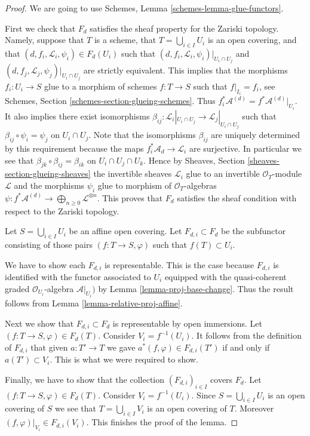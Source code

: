 \begin{proof}
We are going to use Schemes, Lemma \ref{schemes-lemma-glue-functors}.

\medskip\noindent
First we check that $F_d$ satisfies the sheaf property for the
Zariski topology. Namely, suppose that $T$ is a scheme,
that $T = \bigcup_{i \in I} U_i$ is an open covering,
and that $(d, f_i, \mathcal{L}_i, \psi_i) \in F_d(U_i)$ such that
$(d, f_i, \mathcal{L}_i, \psi_i)|_{U_i \cap U_j}$ and
$(d, f_j, \mathcal{L}_j, \psi_j)|_{U_i \cap U_j}$ are strictly
equivalent. This implies that the morphisms $f_i : U_i \to S$
glue to a morphism of schemes $f : T \to S$ such that
$f|_{I_i} = f_i$, see Schemes, Section \ref{schemes-section-glueing-schemes}.
Thus $f_i^*\mathcal{A}^{(d)} = f^*\mathcal{A}^{(d)}|_{U_i}$.
It also implies there exist isomorphisms
$\beta_{ij} : \mathcal{L}_i|_{U_i \cap U_j} \to \mathcal{L}_j|_{U_i \cap U_j}$
such that $\beta_{ij} \circ \psi_i = \psi_j$ on $U_i \cap U_j$.
Note that the isomorphisms $\beta_{ij}$ are uniquely determined
by this requirement because the maps $f_i^*\mathcal{A}_d \to \mathcal{L}_i$
are surjective. In particular we see that
$\beta_{jk} \circ \beta_{ij} = \beta_{ik}$ on $U_i \cap U_j \cap U_k$.
Hence by Sheaves,
Section \ref{sheaves-section-glueing-sheaves} the invertible sheaves
$\mathcal{L}_i$ glue to an invertible $\mathcal{O}_T$-module
$\mathcal{L}$ and the morphisms $\psi_i$ glue to
morphism of $\mathcal{O}_T$-algebras
$\psi : f^*\mathcal{A}^{(d)} \to \bigoplus_{n \geq 0} \mathcal{L}^{\otimes n}$.
This proves that $F_d$ satisfies the sheaf condition with respect to
the Zariski topology.

\medskip\noindent
Let $S = \bigcup_{i \in I} U_i$ be an affine open covering.
Let $F_{d, i} \subset F_d$ be the subfunctor consisting of
those pairs $(f : T \to S, \varphi)$ such that
$f(T) \subset U_i$.

\medskip\noindent
We have to show each $F_{d, i}$ is representable.
This is the case because $F_{d, i}$ is identified with
the functor associated to $U_i$ equipped with
the quasi-coherent graded $\mathcal{O}_{U_i}$-algebra
$\mathcal{A}|_{U_i})$ by Lemma \ref{lemma-proj-base-change}.
Thus the result follows from Lemma \ref{lemma-relative-proj-affine}.

\medskip\noindent
Next we show that $F_{d, i} \subset F_d$ is representable by open immersions.
Let $(f : T \to S, \varphi) \in F_d(T)$. Consider $V_i = f^{-1}(U_i)$.
It follows from the definition of $F_{d, i}$ that given $a : T' \to T$
we gave $a^*(f, \varphi) \in F_{d, i}(T')$ if and only if $a(T') \subset V_i$.
This is what we were required to show.

\medskip\noindent
Finally, we have to show that the collection $(F_{d, i})_{i \in I}$
covers $F_d$. Let $(f : T \to S, \varphi) \in F_d(T)$.
Consider $V_i = f^{-1}(U_i)$. Since $S = \bigcup_{i \in I} U_i$
is an open covering of $S$ we see that $T = \bigcup_{i \in I} V_i$
is an open covering of $T$. Moreover $(f, \varphi)|_{V_i} \in F_{d, i}(V_i)$.
This finishes the proof of the lemma.
\end{proof}

